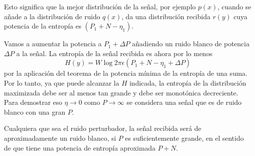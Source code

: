 Esto significa que la mejor distribuci\'on de la se\~nal, por ejemplo
$p(x)$, cuando se a\~nade a la distribuci\'on de ruido $q(x)$, da una
distribuci\'on recibida $r(y)$ cuya potencia de la entrop\'ia es
$(P_{1} + N - \eta_{1})$.
	
Vamos a aumentar la potencia a $P_{1} + \Delta P$ a\~nadiendo un ruido
blanco de potencia $\Delta P$ a la se\~nal.  La entrop\'ia de la
se\~nal recibida es ahora por lo menos
\begin{equation}
H(y) = W \log 2\pi \epsilon (P_{1}+N-\eta_{1}+\Delta P)
\end{equation}
por la aplicaci\'on del teorema de la potencia m\'inima de la
entrop\'ia de una suma.  Por lo tanto, ya que puede alcanzar la $H$
indicada, la entrop\'ia de la distribuci\'{o}n maximizada debe ser al
menos tan grande y debe ser monot\'onica decreciente.  Para demostrar
eso $\eta \rightarrow 0$ como $P \rightarrow \infty$ se considera una
se\~nal que es de ruido blanco con una gran $P$.
	
Cualquiera que sea el ruido perturbador, la se\~nal recibida ser\'a de
aproximadamente un ruido blanco, si $P$ es suficientemente grande, en
el sentido de que tiene una potencia de entrop\'ia aproximada $P + N$.
	



